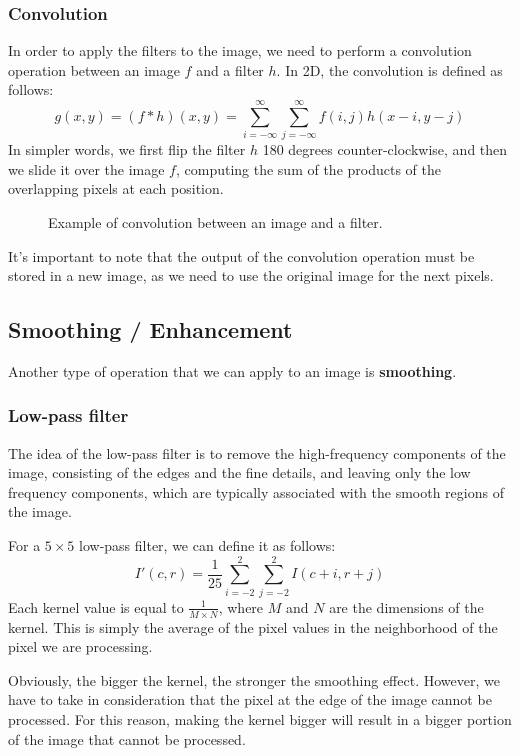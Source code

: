 \subsubsection{Convolution}
In order to apply the filters to the image, we need to perform a convolution operation between an image $f$ and a filter $h$.
In 2D, the convolution is defined as follows:
\begin{equation}
    g(x,y) = (f * h)(x,y) = \sum_{i=-\infty}^{\infty} \sum_{j=-\infty}^{\infty} f(i,j) h(x-i, y-j)
\end{equation}
In simpler words, we first flip the filter $h$ 180 degrees counter-clockwise, and then we slide it over the image $f$, computing 
the sum of the products of the overlapping pixels at each position.
\begin{figure}[H]
    \centering
    \scalebox{0.8}{
        
    }
    \caption{Example of convolution between an image and a filter.}
\end{figure} 
It's important to note that the output of the convolution operation must be stored in a new image, as we need to use the original image for the next pixels.

\subsection{Smoothing / Enhancement}
Another type of operation that we can apply to an image is \textbf{smoothing}. 

\subsubsection{Low-pass filter}
The idea of the low-pass filter is to remove the high-frequency components of the image, 
consisting of the edges and the fine details, and
leaving only the low frequency components, which are typically associated with the smooth regions of the image. 

For a $5 \times 5$ low-pass filter, we can define it as follows:
\begin{equation}
    I'(c,r) = \frac{1}{25} \sum_{i=-2}^{2} \sum_{j=-2}^{2} I(c+i, r+j)
\end{equation}
Each kernel value is equal to $\frac{1}{M \times N}$, where $M$ and $N$ are the dimensions of the kernel.
This is simply the average of the pixel values in the neighborhood of the pixel we are processing.

Obviously, the bigger the kernel, the stronger the smoothing effect. However, we have to take in consideration that
the pixel at the edge of the image cannot be processed. For this reason, making the kernel bigger will result in a bigger portion of the image that cannot be processed.


